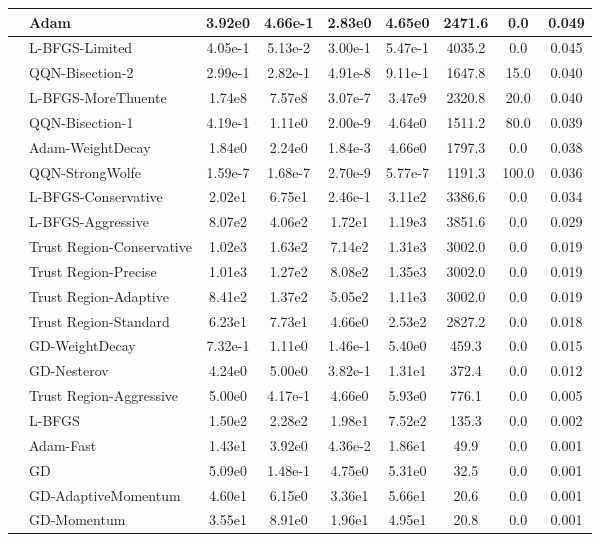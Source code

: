 \documentclass[10pt]{article}
\begin{document}
\begin{longtable}{|l|l|c|c|c|c|c|c|c|}
\hline
 & Adam & 3.92e0 & 4.66e-1 & 2.83e0 & 4.65e0 & 2471.6 & 0.0 & 0.049 \\
\hline
 & L-BFGS-Limited & 4.05e-1 & 5.13e-2 & 3.00e-1 & 5.47e-1 & 4035.2 & 0.0 & 0.045 \\
\hline
 & QQN-Bisection-2 & 2.99e-1 & 2.82e-1 & 4.91e-8 & 9.11e-1 & 1647.8 & 15.0 & 0.040 \\
\hline
 & L-BFGS-MoreThuente & 1.74e8 & 7.57e8 & 3.07e-7 & 3.47e9 & 2320.8 & 20.0 & 0.040 \\
\hline
 & QQN-Bisection-1 & 4.19e-1 & 1.11e0 & 2.00e-9 & 4.64e0 & 1511.2 & 80.0 & 0.039 \\
\hline
 & Adam-WeightDecay & 1.84e0 & 2.24e0 & 1.84e-3 & 4.66e0 & 1797.3 & 0.0 & 0.038 \\
\hline
 & QQN-StrongWolfe & 1.59e-7 & 1.68e-7 & 2.70e-9 & 5.77e-7 & 1191.3 & 100.0 & 0.036 \\
\hline
 & L-BFGS-Conservative & 2.02e1 & 6.75e1 & 2.46e-1 & 3.11e2 & 3386.6 & 0.0 & 0.034 \\
\hline
 & L-BFGS-Aggressive & 8.07e2 & 4.06e2 & 1.72e1 & 1.19e3 & 3851.6 & 0.0 & 0.029 \\
\hline
 & Trust Region-Conservative & 1.02e3 & 1.63e2 & 7.14e2 & 1.31e3 & 3002.0 & 0.0 & 0.019 \\
\hline
 & Trust Region-Precise & 1.01e3 & 1.27e2 & 8.08e2 & 1.35e3 & 3002.0 & 0.0 & 0.019 \\
\hline
 & Trust Region-Adaptive & 8.41e2 & 1.37e2 & 5.05e2 & 1.11e3 & 3002.0 & 0.0 & 0.019 \\
\hline
 & Trust Region-Standard & 6.23e1 & 7.73e1 & 4.66e0 & 2.53e2 & 2827.2 & 0.0 & 0.018 \\
\hline
 & GD-WeightDecay & 7.32e-1 & 1.11e0 & 1.46e-1 & 5.40e0 & 459.3 & 0.0 & 0.015 \\
\hline
 & GD-Nesterov & 4.24e0 & 5.00e0 & 3.82e-1 & 1.31e1 & 372.4 & 0.0 & 0.012 \\
\hline
 & Trust Region-Aggressive & 5.00e0 & 4.17e-1 & 4.66e0 & 5.93e0 & 776.1 & 0.0 & 0.005 \\
\hline
 & L-BFGS & 1.50e2 & 2.28e2 & 1.98e1 & 7.52e2 & 135.3 & 0.0 & 0.002 \\
\hline
 & Adam-Fast & 1.43e1 & 3.92e0 & 4.36e-2 & 1.86e1 & 49.9 & 0.0 & 0.001 \\
\hline
 & GD & 5.09e0 & 1.48e-1 & 4.75e0 & 5.31e0 & 32.5 & 0.0 & 0.001 \\
\hline
 & GD-AdaptiveMomentum & 4.60e1 & 6.15e0 & 3.36e1 & 5.66e1 & 20.6 & 0.0 & 0.001 \\
\hline
 & GD-Momentum & 3.55e1 & 8.91e0 & 1.96e1 & 4.95e1 & 20.8 & 0.0 & 0.001 \\

\end{longtable}
\end{document}
